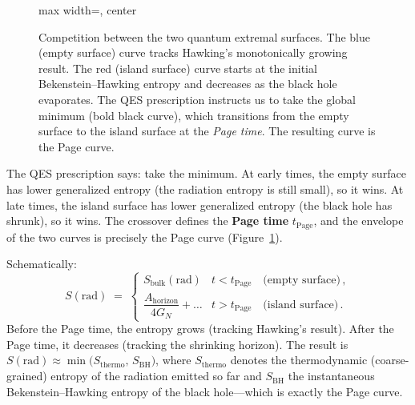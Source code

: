 \documentclass[11pt,letterpaper]{article}
\theoremstyle{plain}
\theoremstyle{definition}
\theoremstyle{remark}
\begin{document}
\begin{figure}[t]
\centering
\begin{adjustbox}{max width=\textwidth, center}
\end{adjustbox}
\caption{Competition between the two quantum extremal surfaces.
  The blue (empty surface) curve tracks Hawking's monotonically
  growing result.  The red (island surface) curve starts at the
  initial Bekenstein--Hawking entropy and decreases as the black
  hole evaporates.  The QES prescription instructs us to take the
  global minimum (bold black curve), which transitions from the
  empty surface to the island surface at the \emph{Page time}.
  The resulting curve is the Page curve.}
\label{fig04:qes_competition}
\end{figure}

The QES prescription says: take the minimum.  At early times, the
empty surface has lower generalized entropy (the radiation entropy is
still small), so it wins.  At late times, the island surface has lower
generalized entropy (the black hole has shrunk), so it wins.  The
crossover defines the \textbf{Page time} $t_{\mathrm{Page}}$, and the
envelope of the two curves is precisely the Page curve
(Figure~\ref{fig04:qes_competition}).

Schematically:
\begin{equation}
\label{eq04:page_curve_qes}
S(\mathrm{rad}) \;=\;
\begin{cases}
  S_{\mathrm{bulk}}(\mathrm{rad}) & t < t_{\mathrm{Page}}
  \quad\text{(empty surface)}\,,\\[6pt]
  \dfrac{A_{\mathrm{horizon}}}{4G_N} + \ldots & t > t_{\mathrm{Page}}
  \quad\text{(island surface)}\,.
\end{cases}
\end{equation}
Before the Page time, the entropy grows (tracking Hawking's result).
After the Page time, it decreases (tracking the shrinking horizon).
The result is $S(\mathrm{rad}) \approx
\min\bigl(S_{\mathrm{thermo}},\, S_{\mathrm{BH}}\bigr)$, where
$S_{\mathrm{thermo}}$ denotes the thermodynamic (coarse-grained)
entropy of the radiation emitted so far and $S_{\mathrm{BH}}$ the
instantaneous Bekenstein--Hawking entropy of the black hole---which
is exactly the Page curve.
\end{document}
